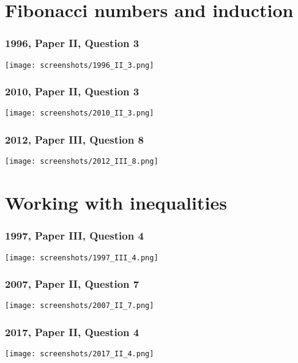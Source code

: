 \documentclass[a4paper,12pt]{article}
\begin{document}
\section{Fibonacci numbers and induction}

\subsubsection{1996, Paper II, Question 3}
\begin{center}
 \texttt{[image: screenshots/1996\_II\_3.png]}
\end{center}

\subsubsection{2010, Paper II, Question 3}
\begin{center}
 \texttt{[image: screenshots/2010\_II\_3.png]}
\end{center}

\subsubsection{2012, Paper III, Question 8}
\begin{center}
 \texttt{[image: screenshots/2012\_III\_8.png]}
\end{center}

\section{Working with inequalities}

\subsubsection{1997, Paper III, Question 4}
\begin{center}
 \texttt{[image: screenshots/1997\_III\_4.png]}
\end{center}

\subsubsection{2007, Paper II, Question 7}
\begin{center}
 \texttt{[image: screenshots/2007\_II\_7.png]}
\end{center}

\subsubsection{2017, Paper II, Question 4}
\begin{center}
 \texttt{[image: screenshots/2017\_II\_4.png]}
\end{center}
\end{document}
